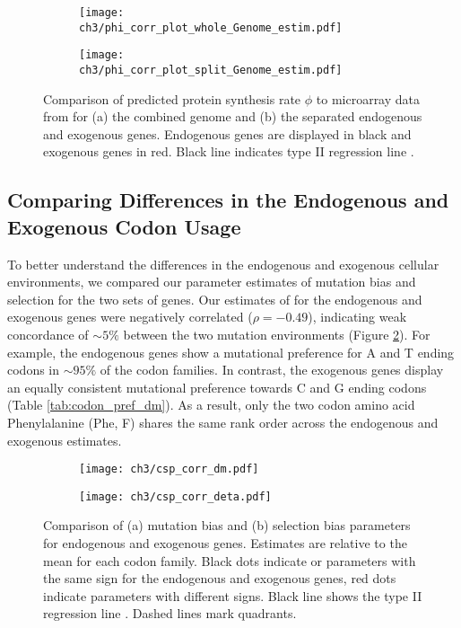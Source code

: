 \begin{figure}
    \centering
    \begin{subfigure}
        \centering
        \texttt{[image: ch3/phi\_corr\_plot\_whole\_Genome\_estim.pdf]}
    \end{subfigure}
    \begin{subfigure}
        \centering
        \texttt{[image: ch3/phi\_corr\_plot\_split\_Genome\_estim.pdf]}
    \end{subfigure}
    \caption{Comparison of predicted protein synthesis rate $\phi$ to microarray data from \citet{tsankov2010} for (a) the combined genome and (b) the separated endogenous and exogenous genes. 
    Endogenous genes are displayed in black and exogenous genes in red. Black line indicates type II regression line \cite{SokalAndRohlf1981}.}
    \label{fig:phi_corr_two_cond}
\end{figure}


\subsection{Comparing Differences in the Endogenous and Exogenous Codon Usage}
To better understand the differences in the endogenous and exogenous cellular environments, we compared our parameter estimates of mutation bias \DM and selection \DE for the two sets of genes.
Our estimates of \DM for the endogenous and exogenous genes were negatively correlated ($\rho = -0.49$),  indicating weak concordance of $\sim5\%$ between the two mutation environments (Figure \ref{fig:csp_comp}).
For example, the endogenous genes show a mutational preference for A and T ending codons in $\sim95\%$ of the codon families.
In contrast, the exogenous genes display an equally consistent mutational preference towards C and G ending codons (Table \ref{tab:codon_pref_dm}).
As a result, only the two codon amino acid Phenylalanine (Phe, F) shares the same rank order across the endogenous and exogenous \DM estimates.

\begin{figure}
    \centering
    \begin{subfigure}
        \centering
        \texttt{[image: ch3/csp\_corr\_dm.pdf]}
    \end{subfigure}
    \begin{subfigure}
        \centering
        \texttt{[image: ch3/csp\_corr\_deta.pdf]}
    \end{subfigure}
    \caption{Comparison of (a) mutation bias \DM and (b) selection bias \DE parameters for endogenous and exogenous genes.
      Estimates are relative to the mean for each codon family.
      Black dots indicate \DM or \DE parameters with the same sign for the endogenous and exogenous genes, red dots indicate parameters with different signs.
      Black line shows the type II regression line \citep{SokalAndRohlf1981}.
      Dashed lines mark quadrants.}
    \label{fig:csp_comp}
\end{figure}

